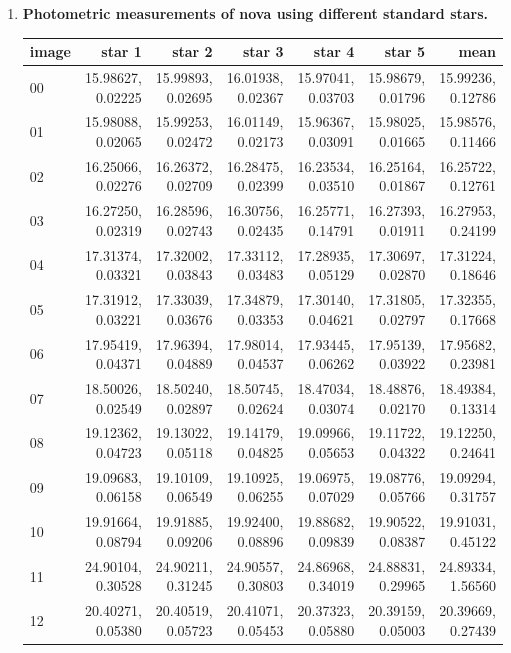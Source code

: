 \documentclass{article}
\begin{document}
\begin{enumerate}
		\item \textbf{Photometric measurements of nova using different standard stars.}
		\begin{table} [h]
			\centering
			\begin{tabular} {l r r r r r r}
				\toprule
				\textbf{image} & \textbf{star 1} & \textbf{star 2} & \textbf{star 3} & \textbf{star 4} & \textbf{star 5} & \textbf{mean}\\
				\midrule
				00 & 15.98627, 0.02225 & 15.99893, 0.02695 & 16.01938, 0.02367 & 15.97041, 0.03703 & 15.98679, 0.01796 & 15.99236, 0.12786 \\
				01 & 15.98088, 0.02065 & 15.99253, 0.02472 & 16.01149, 0.02173 & 15.96367, 0.03091 & 15.98025, 0.01665 & 15.98576, 0.11466 \\
				02 & 16.25066, 0.02276 & 16.26372, 0.02709 & 16.28475, 0.02399 & 16.23534, 0.03510 & 16.25164, 0.01867 & 16.25722, 0.12761 \\
				03 & 16.27250, 0.02319 & 16.28596, 0.02743 & 16.30756, 0.02435 & 16.25771, 0.14791 & 16.27393, 0.01911 & 16.27953, 0.24199 \\
				04 & 17.31374, 0.03321 & 17.32002, 0.03843 & 17.33112, 0.03483 & 17.28935, 0.05129 & 17.30697, 0.02870 & 17.31224, 0.18646 \\
				05 & 17.31912, 0.03221 & 17.33039, 0.03676 & 17.34879, 0.03353 & 17.30140, 0.04621 & 17.31805, 0.02797 & 17.32355, 0.17668 \\
				06 & 17.95419, 0.04371 & 17.96394, 0.04889 & 17.98014, 0.04537 & 17.93445, 0.06262 & 17.95139, 0.03922 & 17.95682, 0.23981 \\
				07 & 18.50026, 0.02549 & 18.50240, 0.02897 & 18.50745, 0.02624 & 18.47034, 0.03074 & 18.48876, 0.02170 & 18.49384, 0.13314 \\
				08 & 19.12362, 0.04723 & 19.13022, 0.05118 & 19.14179, 0.04825 & 19.09966, 0.05653 & 19.11722, 0.04322 & 19.12250, 0.24641 \\
				09 & 19.09683, 0.06158 & 19.10109, 0.06549 & 19.10925, 0.06255 & 19.06975, 0.07029 & 19.08776, 0.05766 & 19.09294, 0.31757 \\
				10 & 19.91664, 0.08794 & 19.91885, 0.09206 & 19.92400, 0.08896 & 19.88682, 0.09839 & 19.90522, 0.08387 & 19.91031, 0.45122 \\
				11 & 24.90104, 0.30528 & 24.90211, 0.31245 & 24.90557, 0.30803 & 24.86968, 0.34019 & 24.88831, 0.29965 & 24.89334, 1.56560 \\
				12 & 20.40271, 0.05380 & 20.40519, 0.05723 & 20.41071, 0.05453 & 20.37323, 0.05880 & 20.39159, 0.05003 & 20.39669, 0.27439 \\

\end{tabular}
\end{table}
\end{enumerate}
\end{document}
